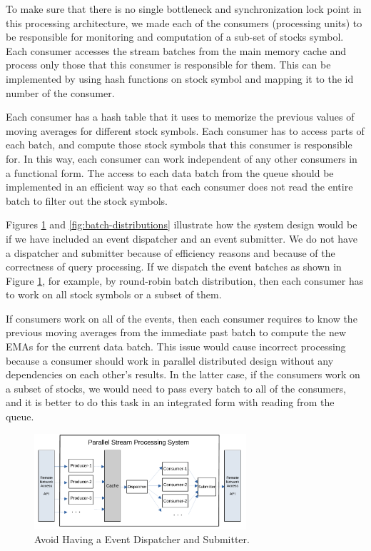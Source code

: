 To make sure that there is no single bottleneck and synchronization lock point in this processing architecture, we made each of the consumers
(processing units) to be responsible for monitoring and computation of a sub-set of stocks symbol. Each consumer accesses the stream batches from the main memory cache and process only those that this consumer is responsible for them. This can be implemented by using hash functions on stock symbol and mapping it to the id number of the consumer. 

Each consumer has a hash table that it uses to memorize the previous values of moving averages for different stock symbols.  
Each consumer has to access parts of each batch, and compute those stock symbols that this consumer is responsible for. In this way, each consumer can work independent of any other consumers in a functional form. The access to each data batch from the queue should be implemented in an efficient way so that each consumer does not read the entire batch to filter out the stock symbols. 

Figures \ref{fig:parallel-srream-processing} and \ref{fig:batch-distributions} illustrate how the system design would be if we have included an event dispatcher and an event submitter. We do not have a dispatcher and submitter because of efficiency reasons and because of the correctness of query processing. 
If we dispatch the event batches as shown in Figure \ref{fig:parallel-srream-processing}, for example, by round-robin batch distribution, then each consumer has to work on all stock symbols or a subset of them. 

If consumers work on all of the events, then each consumer requires to know the previous moving averages from the immediate past batch to compute the new EMAs for the current data batch. This issue would cause incorrect processing because a consumer should work in parallel distributed design without any dependencies on each other's results. 
In the latter case, if the consumers work on a subset of stocks, we would need to pass every batch to all of the consumers, and it is better to do this task in an integrated form with reading from the queue.



\begin{figure}[]
    \begin{center}
        \includegraphics[width=0.7\textwidth]{./images/Parallel-Stream-Processing-System}
        \caption{Avoid Having a Event Dispatcher and Submitter.}
        \label{fig:parallel-srream-processing}
    \end{center}
\end{figure}


